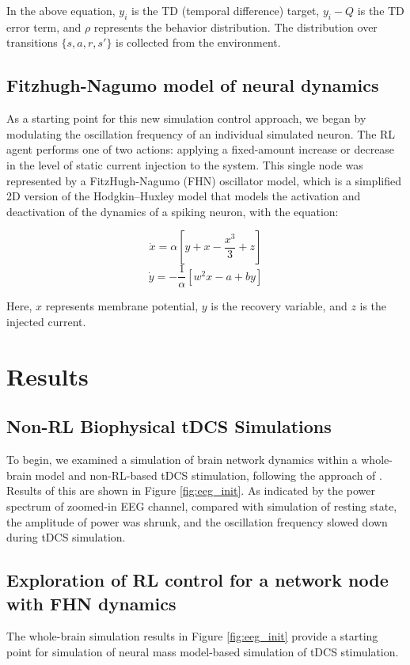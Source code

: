 \documentclass[12pt, a4paper]{article}
\begin{document}
In the above equation, $y_i$ is the TD (temporal difference) target, $y_i - Q$ is the TD error term, and $\rho$ represents the behavior distribution. The distribution over transitions $ \{s,a,r,s'\}$ is collected from the environment.

\subsection*{Fitzhugh-Nagumo model of neural dynamics}
As a starting point for this new simulation control approach, we began by modulating the oscillation frequency of an individual simulated neuron. The RL agent performs one of two actions: applying a fixed-amount increase or decrease in the level of static current injection to the system. This single node was represented by a FitzHugh-Nagumo (FHN) oscillator model, which is a simplified 2D version of the Hodgkin–Huxley model that models the activation and deactivation of the dynamics of a spiking neuron, with the equation:

\[ \dot{x} =  \alpha \left [ y + x - \frac{x^{3}}{3} + z \right ] \]
\[ \dot{y} =  - \frac{1}{\alpha} \left [ w^{2}x - a  + by \right ] \]

Here, $x$ represents membrane potential, $y$ is the recovery variable, and $z$ is the injected current.



\section*{Results} %
\subsection*{Non-RL Biophysical tDCS Simulations}
To begin, we examined a simulation of brain network dynamics within a whole-brain model and non-RL-based tDCS stimulation, following the approach of \textcite{kunzeTranscranialDirectCurrent2016}. Results of this are shown in Figure \ref{fig:eeg_init}. As indicated by the power spectrum of zoomed-in EEG channel, compared with simulation of resting state, the amplitude of power was shrunk, and the oscillation frequency slowed down during tDCS simulation.

\subsection*{Exploration of RL control for a network node with FHN dynamics}
The whole-brain simulation results in Figure \ref{fig:eeg_init} provide a starting point for simulation of neural mass model-based simulation of tDCS stimulation.
\end{document}
